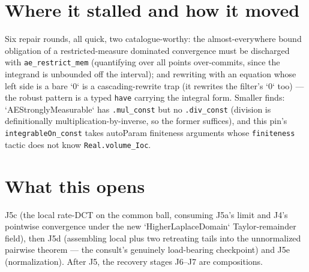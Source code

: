 \documentclass[11pt]{article}
\begin{document}
\section{Where it stalled and how it moved}

Six repair rounds, all quick, two catalogue-worthy: the
almost-everywhere bound obligation of a restricted-measure dominated
convergence must be discharged with
\texttt{ae\_restrict\_mem} (quantifying over all points
over-commits, since the integrand is unbounded off the interval);
and rewriting with an equation whose left side is a bare `0` is a
cascading-rewrite trap (it rewrites the filter's `0` too) --- the
robust pattern is a typed \texttt{have} carrying the integral form.
Smaller finds: `AEStronglyMeasurable` has \texttt{.mul\_const} but no
\texttt{.div\_const} (division is definitionally
multiplication-by-inverse, so the former suffices), and this pin's
\texttt{integrableOn\_const} takes autoParam finiteness arguments
whose \texttt{finiteness} tactic does not know
\texttt{Real.volume\_Ioc}.

\section{What this opens}

J5c (the local rate-DCT on the common ball, consuming J5a's limit and
J4's pointwise convergence under the new `HigherLaplaceDomain`
Taylor-remainder field), then J5d (assembling local plus two
retreating tails into the unnormalized pairwise theorem --- the
consult's genuinely load-bearing checkpoint) and J5e (normalization).
After J5, the recovery stages J6--J7 are compositions.
\end{document}
